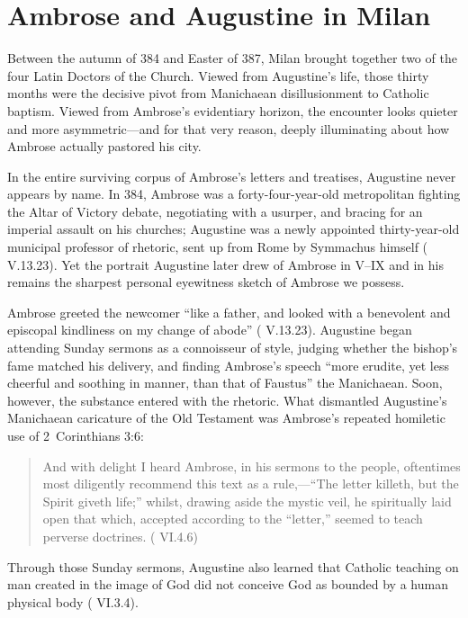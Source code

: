 \section{Ambrose and Augustine in Milan}

Between the autumn of 384 and Easter of 387, Milan brought together two of the four Latin Doctors of the Church. Viewed from Augustine's life, those thirty months were the decisive pivot from Manichaean disillusionment to Catholic baptism. Viewed from Ambrose's evidentiary horizon, the encounter looks quieter and more asymmetric---and for that very reason, deeply illuminating about how Ambrose actually pastored his city.

In the entire surviving corpus of Ambrose's letters and treatises, Augustine never appears by name. In 384, Ambrose was a forty-four-year-old metropolitan fighting the Altar of Victory debate, negotiating with a usurper, and bracing for an imperial assault on his churches; Augustine was a newly appointed thirty-year-old municipal professor of rhetoric, sent up from Rome by Symmachus himself ( V.13.23). Yet the portrait Augustine later drew of Ambrose in  V--IX and in his  remains the sharpest personal eyewitness sketch of Ambrose we possess.

Ambrose greeted the newcomer ``like a father, and looked with a benevolent and episcopal kindliness on my change of abode'' ( V.13.23). Augustine began attending Sunday sermons as a connoisseur of style, judging whether the bishop's fame matched his delivery, and finding Ambrose's speech ``more erudite, yet less cheerful and soothing in manner, than that of Faustus'' the Manichaean. Soon, however, the substance entered with the rhetoric. What dismantled Augustine's Manichaean caricature of the Old Testament was Ambrose's repeated homiletic use of 2~Corinthians 3:6:

\begin{quote}
And with delight I heard Ambrose, in his sermons to the people, oftentimes most diligently recommend this text as a rule,---``The letter killeth, but the Spirit giveth life;'' whilst, drawing aside the mystic veil, he spiritually laid open that which, accepted according to the ``letter,'' seemed to teach perverse doctrines. ( VI.4.6)
\end{quote}

Through those Sunday sermons, Augustine also learned that Catholic teaching on man created in the image of God did not conceive God as bounded by a human physical body ( VI.3.4).

